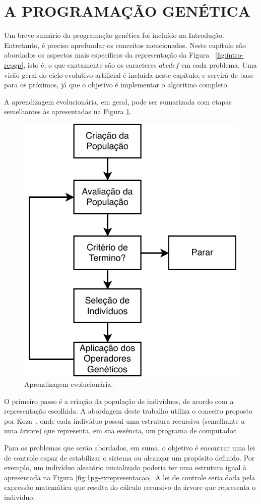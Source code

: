 \section{A PROGRAMAÇÃO GENÉTICA}\label{sec:1pg-apg}

Um breve sumário da programação genética foi incluído na Introdução. Entretanto, é preciso aprofundar os conceitos mencionados. Neste capítulo são abordados os aspectos mais específicos da representação da Figura ~\ref{fig:intro-repgp}, isto é, o que exatamente são os caracteres $abcdef$ em cada problema. Uma visão geral do ciclo evolutivo artificial é incluída neste capítulo, e servirá de base para os próximos, já que o objetivo é implementar o algoritmo completo.

A aprendizagem evolucionária, em geral, pode ser sumarizada com etapas semelhantes às apresentadas na Figura \ref{fig:1pg-ciclosimples}.

\begin{figure}[!htb]
\centering
\includegraphics[width=0.4\linewidth]{02_desenvolvimento/01_Pg_Fig_ExCicloSimples}
\caption{Aprendizagem evolucionária.}\label{fig:1pg-ciclosimples}
\end{figure}

O primeiro passo é a criação da população de indivíduos, de acordo com a representação escolhida. A abordagem deste trabalho utiliza o conceito proposto por Koza~\cite{koza92bookGp}, onde cada indivíduo possui uma estrutura recursiva (semelhante a uma árvore) que representa, em sua essência, um programa de computador.

Para os problemas que serão abordados, em suma, o objetivo é encontrar uma lei de controle capaz de estabilizar o sistema ou alcançar um propósito definido. Por exemplo, um indivíduo aleatório inicializado poderia ter uma estrutura igual à apresentada na Figura \ref{fig:1pg-exrepresentacao}. A lei de controle seria dada pela expressão matemática que resulta do cálculo recursivo da árvore que representa o indivíduo.

